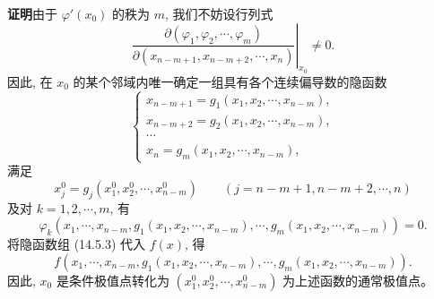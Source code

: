 \documentclass[UTF8, 12pt, fontset=fandol, oneside]{ctexart}
\begin{document}
\noindent\textbf{证明}\quad 由于 $\varphi'(x_0)$ 的秩为 $m$, 我们不妨设行列式
\[
  \left.
  \frac{\partial(\varphi_1,\varphi_2,\cdots,\varphi_m)}
       {\partial(x_{n-m+1},x_{n-m+2},\cdots,x_n)}
  \right|_{x_0}
  \ne0.
\]
因此, 在 $x_0$ 的某个邻域内唯一确定一组具有各个连续偏导数的隐函数
\begin{equation}
  \begin{cases}
    x_{n-m+1}=g_1(x_1,x_2,\cdots,x_{n-m}),\\
    x_{n-m+2}=g_2(x_1,x_2,\cdots,x_{n-m}),\\
    \cdots\\
    x_n=g_m(x_1,x_2,\cdots,x_{n-m}),
  \end{cases}
  \tag{14.5.3}
\end{equation}
满足
\[
  x_j^0=g_j(x_1^0,x_2^0,\cdots,x_{n-m}^0)
  \qquad (j=n-m+1,n-m+2,\cdots,n)
\]
及对 $k=1,2,\cdots,m$, 有
\[
  \varphi_k(x_1,\cdots,x_{n-m},g_1(x_1,x_2,\cdots,x_{n-m}),\cdots,g_m(x_1,x_2,\cdots,x_{n-m}))=0.
\]
将隐函数组 (14.5.3) 代入 $f(x)$, 得
\[
  f(x_1,\cdots,x_{n-m},g_1(x_1,x_2,\cdots,x_{n-m}),\cdots,g_m(x_1,x_2,\cdots,x_{n-m})).
\]
因此, $x_0$ 是条件极值点转化为 $(x_1^0,x_2^0,\cdots,x_{n-m}^0)$ 为上述函数的通常极值点。
\end{document}
